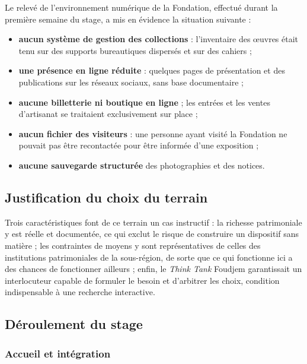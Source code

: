 Le relevé de l'environnement numérique de la Fondation, effectué durant la
première semaine du stage, a mis en évidence la situation suivante :

\begin{itemize}
  \item \textbf{aucun système de gestion des collections} : l'inventaire des
        œuvres était tenu sur des supports bureautiques dispersés et sur des
        cahiers ;
  \item \textbf{une présence en ligne réduite} : quelques pages de présentation
        et des publications sur les réseaux sociaux, sans base documentaire ;
  \item \textbf{aucune billetterie ni boutique en ligne} ; les entrées et les
        ventes d'artisanat se traitaient exclusivement sur place ;
  \item \textbf{aucun fichier des visiteurs} : une personne ayant visité la
        Fondation ne pouvait pas être recontactée pour être informée d'une
        exposition ;
  \item \textbf{aucune sauvegarde structurée} des photographies et des notices.
\end{itemize}

\subsection{Justification du choix du terrain}

Trois caractéristiques font de ce terrain un cas instructif : la richesse
patrimoniale y est réelle et documentée, ce qui exclut le risque de construire
un dispositif sans matière ; les contraintes de moyens y sont représentatives de
celles des institutions patrimoniales de la sous-région, de sorte que ce qui
fonctionne ici a des chances de fonctionner ailleurs ; enfin, le \emph{Think
Tank} Foudjem garantissait un interlocuteur capable de formuler le besoin et
d'arbitrer les choix, condition indispensable à une recherche interactive.

\subsection{Déroulement du stage}
\label{sec:stage}

\subsubsection{Accueil et intégration}

